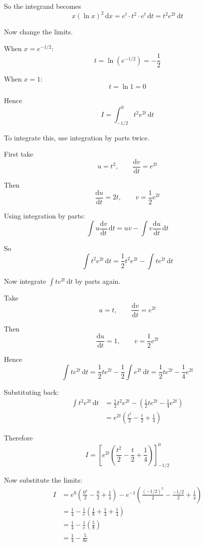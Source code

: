 \documentclass[leqno]{article}
\begin{document}
\begin{enumerate}[
  label=\textbf{\arabic*.},
  leftmargin=*,
  topsep=0pt,
  partopsep=0pt,
  parsep=0pt
]
\begin{djsSolution}
So the integrand becomes
\[
x(\ln x)^2\,\mathrm{d}x=e^t\cdot t^2\cdot e^t\,\mathrm{d}t=t^2e^{2t}\,\mathrm{d}t
\]

Now change the limits.

When $x=e^{-1/2}$:
\[
t=\ln\left(e^{-1/2}\right)=-\frac12
\]

When $x=1$:
\[
t=\ln 1=0
\]

Hence
\[
I=\int_{-1/2}^{0} t^2e^{2t}\,\mathrm{d}t
\]

To integrate this, use integration by parts twice.

First take
\[
u=t^2,\qquad \frac{\mathrm{d}v}{\mathrm{d}t}=e^{2t}
\]

Then
\[
\frac{\mathrm{d}u}{\mathrm{d}t}=2t,
\qquad
v=\frac12 e^{2t}
\]

Using integration by parts:
\[
\int u\frac{\mathrm{d}v}{\mathrm{d}t}\,\mathrm{d}t = uv - \int v\frac{\mathrm{d}u}{\mathrm{d}t}\,\mathrm{d}t
\]

So
\[
\int t^2e^{2t}\,\mathrm{d}t
=
\frac12 t^2e^{2t}-\int t e^{2t}\,\mathrm{d}t
\]

Now integrate $\int t e^{2t}\,\mathrm{d}t$ by parts again.

Take
\[
u=t,\qquad \frac{\mathrm{d}v}{\mathrm{d}t}=e^{2t}
\]

Then
\[
\frac{\mathrm{d}u}{\mathrm{d}t}=1,
\qquad
v=\frac12 e^{2t}
\]

Hence
\[
\int t e^{2t}\,\mathrm{d}t
=
\frac12 te^{2t}-\frac12\int e^{2t}\,\mathrm{d}t
=
\frac12 te^{2t}-\frac14 e^{2t}
\]

Substituting back:
\begin{align*}
\int t^2e^{2t}\,\mathrm{d}t
&=
\frac12 t^2e^{2t}-\left(\frac12 te^{2t}-\frac14 e^{2t}\right) \\
&=
e^{2t}\left(\frac{t^2}{2}-\frac{t}{2}+\frac14\right)
\end{align*}

Therefore
\[
I=\left[e^{2t}\left(\frac{t^2}{2}-\frac{t}{2}+\frac14\right)\right]_{-1/2}^{0}
\]

Now substitute the limits:
\begin{align*}
I
&=
e^0\left(\frac{0^2}{2}-\frac{0}{2}+\frac14\right)
-
e^{-1}\left(\frac{(-1/2)^2}{2}-\frac{-1/2}{2}+\frac14\right) \\
&=
\frac14-\frac1e\left(\frac18+\frac14+\frac14\right) \\
&=
\frac14-\frac1e\left(\frac58\right) \\
&=
\frac14-\frac{5}{8e}
\end{align*}


\end{djsSolution}
\end{enumerate}
\end{document}
